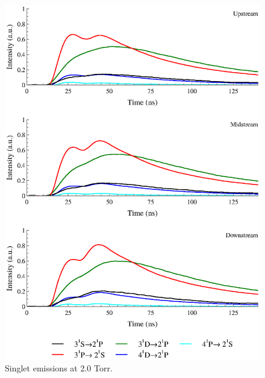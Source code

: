 \begin{figure}
  \centering
  \includegraphics{./chapters/extraem/figures/2torr_s.eps}
  \caption{Singlet emissions at 2.0 Torr.}
\end{figure}
